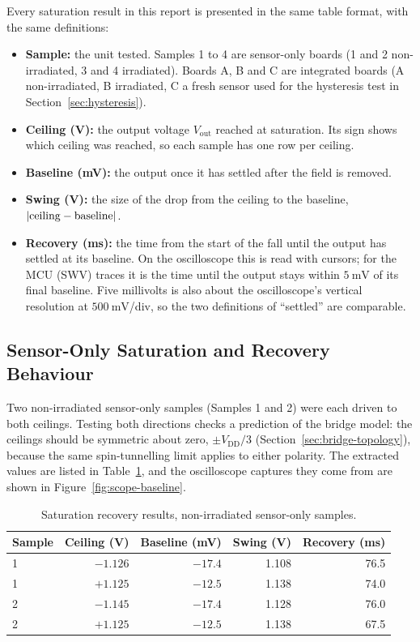 \documentclass[12pt,a4paper]{article}
\begin{document}
Every saturation result in this report is presented in the same table format, with the same definitions:
\begin{itemize}
\item \textbf{Sample:} the unit tested. Samples 1 to 4 are sensor-only boards (1 and 2 non-irradiated, 3 and 4 irradiated). Boards A, B and C are integrated boards (A non-irradiated, B irradiated, C a fresh sensor used for the hysteresis test in Section~\ref{sec:hysteresis}).
\item \textbf{Ceiling (V):} the output voltage $V_{\text{out}}$ reached at saturation. Its sign shows which ceiling was reached, so each sample has one row per ceiling.
\item \textbf{Baseline (mV):} the output once it has settled after the field is removed.
\item \textbf{Swing (V):} the size of the drop from the ceiling to the baseline, $|{\rm ceiling} - {\rm baseline}|$.
\item \textbf{Recovery (ms):} the time from the start of the fall until the output has settled at its baseline. On the oscilloscope this is read with cursors; for the MCU (SWV) traces it is the time until the output stays within $\SI{5}{\milli\volt}$ of its final baseline. Five millivolts is also about the oscilloscope's vertical resolution at $\SI{500}{\milli\volt}$/div, so the two definitions of ``settled'' are comparable.
\end{itemize}

\subsection{Sensor-Only Saturation and Recovery Behaviour}
\label{sec:standalone-sat-recovery}

Two non-irradiated sensor-only samples (Samples 1 and 2) were each driven to both ceilings. Testing both directions checks a prediction of the bridge model: the ceilings should be symmetric about zero, $\pm V_{\text{DD}}/3$ (Section~\ref{sec:bridge-topology}), because the same spin-tunnelling limit applies to either polarity. The extracted values are listed in Table~\ref{tab:sat-nonirr-sensoronly}, and the oscilloscope captures they come from are shown in Figure~\ref{fig:scope-baseline}.

\begin{table}[H]
\centering
\caption{Saturation recovery results, non-irradiated sensor-only samples.}
\label{tab:sat-nonirr-sensoronly}
\begin{tabular}{@{}lrrrr@{}}
\toprule
Sample & Ceiling (V) & Baseline (mV) & Swing (V) & Recovery (ms) \\
\midrule
1 & $-1.126$ & $-17.4$ & 1.108 & 76.5 \\
1 & $+1.125$ & $-12.5$ & 1.138 & 74.0 \\
2 & $-1.145$ & $-17.4$ & 1.128 & 76.0 \\
2 & $+1.125$ & $-12.5$ & 1.138 & 67.5 \\
\bottomrule
\end{tabular}
\end{table}
\end{document}
